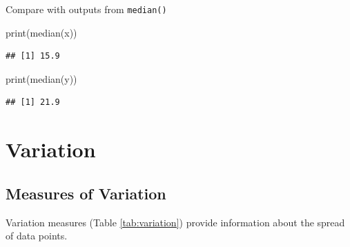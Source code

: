 \documentclass[
]{book}
\newenvironment{Shaded}{\begin{snugshade}}{\end{snugshade}}
\newcommand{\FunctionTok}[1]{\textcolor[rgb]{0.00,0.00,0.00}{#1}}
\newcommand{\NormalTok}[1]{#1}
\begin{document}
Compare with outputs from \texttt{median()}

\begin{Shaded}
\begin{Highlighting}[]
\FunctionTok{print}\NormalTok{(}\FunctionTok{median}\NormalTok{(x))}
\end{Highlighting}
\end{Shaded}

\begin{verbatim}
## [1] 15.9
\end{verbatim}

\begin{Shaded}
\begin{Highlighting}[]
\FunctionTok{print}\NormalTok{(}\FunctionTok{median}\NormalTok{(y))}
\end{Highlighting}
\end{Shaded}

\begin{verbatim}
## [1] 21.9
\end{verbatim}

\hypertarget{variation}{%
\section{Variation}\label{variation}}

\hypertarget{measures-of-variation}{%
\subsection{Measures of Variation}\label{measures-of-variation}}

Variation measures (Table \ref{tab:variation}) provide information about the spread of data points.
\end{document}
